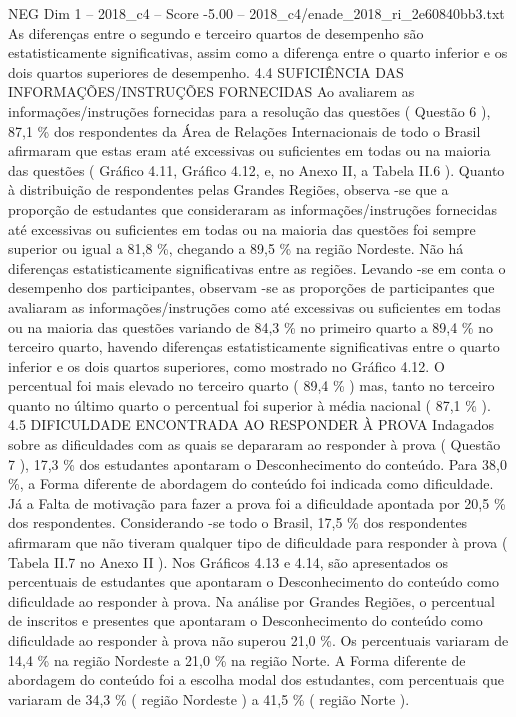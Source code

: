 \begin{textsample}{NEG Dim 1 – 2018\_c4 – Score -5.00 – 2018\_c4/enade\_2018\_ri\_2e60840bb3.txt}
As diferenças entre o segundo e terceiro quartos de desempenho são estatisticamente significativas, assim como a diferença entre o quarto inferior e os dois quartos superiores de desempenho. 4.4 SUFICIÊNCIA DAS INFORMAÇÕES/INSTRUÇÕES FORNECIDAS Ao avaliarem as informações/instruções fornecidas para a resolução das questões ( Questão 6 ), 87,1 \% dos respondentes da Área de Relações Internacionais de todo o Brasil afirmaram que estas eram até excessivas ou suficientes em todas ou na maioria das questões ( Gráfico 4.11, Gráfico 4.12, e, no Anexo II, a Tabela II.6 ).
Quanto à distribuição de respondentes pelas Grandes Regiões, observa -se que a proporção de estudantes que consideraram as informações/instruções fornecidas até excessivas ou suficientes em todas ou na maioria das questões foi sempre superior ou igual a 81,8 \%, chegando a 89,5 \% na região Nordeste.
Não há diferenças estatisticamente significativas entre as regiões.
Levando -se em conta o desempenho dos participantes, observam -se as proporções de participantes que avaliaram as informações/instruções como até excessivas ou suficientes em todas ou na maioria das questões variando de 84,3 \% no primeiro quarto a 89,4 \% no terceiro quarto, havendo diferenças estatisticamente significativas entre o quarto inferior e os dois quartos superiores, como mostrado no Gráfico 4.12.
O percentual foi mais elevado no terceiro quarto ( 89,4 \% ) mas, tanto no terceiro quanto no último quarto o percentual foi superior à média nacional ( 87,1 \% ). 4.5 DIFICULDADE ENCONTRADA AO RESPONDER À PROVA Indagados sobre as dificuldades com as quais se depararam ao responder à prova ( Questão 7 ), 17,3 \% dos estudantes apontaram o Desconhecimento do conteúdo.
Para 38,0 \%, a Forma diferente de abordagem do conteúdo foi indicada como dificuldade.
Já a Falta de motivação para fazer a prova foi a dificuldade apontada por 20,5 \% dos respondentes.
Considerando -se todo o Brasil, 17,5 \% dos respondentes afirmaram que não tiveram qualquer tipo de dificuldade para responder à prova ( Tabela II.7 no Anexo II ).
Nos Gráficos 4.13 e 4.14, são apresentados os percentuais de estudantes que apontaram o Desconhecimento do conteúdo como dificuldade ao responder à prova.
Na análise por Grandes Regiões, o percentual de inscritos e presentes que apontaram o Desconhecimento do conteúdo como dificuldade ao responder à prova não superou 21,0 \%.
Os percentuais variaram de 14,4 \% na região Nordeste a 21,0 \% na região Norte.
A Forma diferente de abordagem do conteúdo foi a escolha modal dos estudantes, com percentuais que variaram de 34,3 \% ( região Nordeste ) a 41,5 \% ( região Norte ).

\end{textsample}

